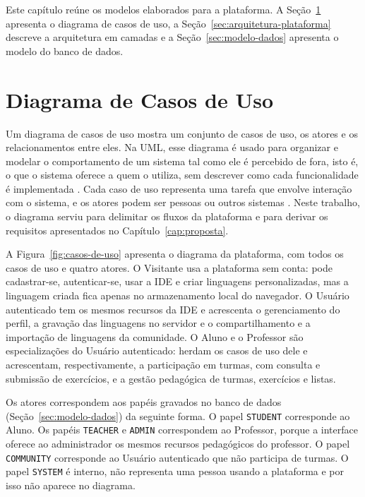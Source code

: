 
Este capítulo reúne os modelos elaborados para a plataforma. A Seção~\ref{sec:casos-de-uso} apresenta o diagrama de casos de uso, a Seção~\ref{sec:arquitetura-plataforma} descreve a arquitetura em camadas e a Seção~\ref{sec:modelo-dados} apresenta o modelo do banco de dados.

\section{Diagrama de Casos de Uso}
\label{sec:casos-de-uso}

Um diagrama de casos de uso mostra um conjunto de casos de uso, os atores e os relacionamentos entre eles. Na UML, esse diagrama é usado para organizar e modelar o comportamento de um sistema tal como ele é percebido de fora, isto é, o que o sistema oferece a quem o utiliza, sem descrever como cada funcionalidade é implementada \cite{booch2006uml}. Cada caso de uso representa uma tarefa que envolve interação com o sistema, e os atores podem ser pessoas ou outros sistemas \cite{sommerville2018}. Neste trabalho, o diagrama serviu para delimitar os fluxos da plataforma e para derivar os requisitos apresentados no Capítulo~\ref{cap:proposta}.

A Figura~\ref{fig:casos-de-uso} apresenta o diagrama da plataforma, com todos os casos de uso e quatro atores. O Visitante usa a plataforma sem conta: pode cadastrar-se, autenticar-se, usar a IDE e criar linguagens personalizadas, mas a linguagem criada fica apenas no armazenamento local do navegador. O Usuário autenticado tem os mesmos recursos da IDE e acrescenta o gerenciamento do perfil, a gravação das linguagens no servidor e o compartilhamento e a importação de linguagens da comunidade. O Aluno e o Professor são especializações do Usuário autenticado: herdam os casos de uso dele e acrescentam, respectivamente, a participação em turmas, com consulta e submissão de exercícios, e a gestão pedagógica de turmas, exercícios e listas.

Os atores correspondem aos papéis gravados no banco de dados (Seção~\ref{sec:modelo-dados}) da seguinte forma. O papel \texttt{STUDENT} corresponde ao Aluno. Os papéis \texttt{TEACHER} e \texttt{ADMIN} correspondem ao Professor, porque a interface oferece ao administrador os mesmos recursos pedagógicos do professor. O papel \texttt{COMMUNITY} corresponde ao Usuário autenticado que não participa de turmas. O papel \texttt{SYSTEM} é interno, não representa uma pessoa usando a plataforma e por isso não aparece no diagrama.

